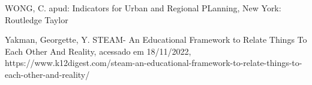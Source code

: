 \documentclass[
12pt,		%
openright,	%
twoside,  %
a4paper,			%
chapter=TITLE,		%
english,			%
french,				%
spanish,			%
brazil				%
]{USPSC-classe/USPSC}
\begin{document}
\begin{flushleft}
\begin{flushleft}
\begin{flushleft}
\begin{flushleft}
\begin{flushleft}
\begin{flushleft}
\begin{flushleft}
\begin{flushleft}
\begin{flushleft}
[WONG, 2006] WONG, C. apud: Indicators for Urban and Regional PLanning, New York: Routledge Taylor 
\end{flushleft}


\end{flushleft}


\end{flushleft}


\end{flushleft}


\end{flushleft}


\end{flushleft}


\end{flushleft}


\end{flushleft}


\end{flushleft}


\begin{flushleft}
\begin{flushleft}
\begin{flushleft}
\begin{flushleft}
\begin{flushleft}
\begin{flushleft}
\begin{flushleft}
\begin{flushleft}
\begin{flushleft}
[YAKMAN, 2019] Yakman, Georgette, Y. STEAM- An Educational Framework to Relate Things To Each Other And Reality, acessado em 18/11/2022, https://www.k12digest.com/steam-an-educational-framework-to-relate-things-to-each-other-and-reality/
\end{flushleft}


\end{flushleft}


\end{flushleft}


\end{flushleft}


\end{flushleft}


\end{flushleft}


\end{flushleft}


\end{flushleft}


\end{flushleft}
\end{document}
